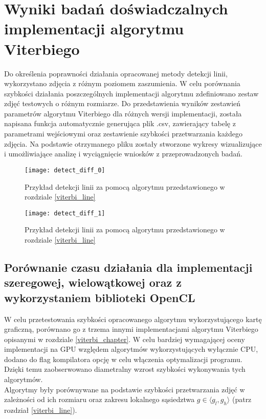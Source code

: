 \documentclass[document.tex]{subfiles}
\begin{document}
\chapter{Wyniki badań doświadczalnych \\ implementacji algorytmu Viterbiego}
\indent Do określenia poprawności działania opracowanej metody detekcji linii, 
wykorzystano zdjęcia z różnym poziomem zaszumienia. W celu porównania szybkości
działania poszczególnych implementacji algorytmu zdefiniowano zestaw zdjęć testowych
o różnym rozmiarze. Do przedstawienia wyników zestawień parametrów algorytmu Viterbiego
dla różnych wersji implementacji, została napisana funkcja automatycznie generująca plik .csv,
zawierający tabelę z parametrami wejściowymi oraz zestawienie szybkości przetwarzania każdego zdjęcia.
Na podstawie otrzymanego pliku zostały stworzone wykresy wizualizujące i umożliwiające
analizę i wyciągnięcie wniosków z przeprowadzonych badań.

\begin{figure}[h]
\texttt{[image: detect\_diff\_0]}
\caption{Przykład detekcji linii za pomocą algorytmu przedstawionego w rozdziale \ref{viterbi_line}}
\label{fig:sample_detect_0}
\end{figure}

\clearpage

\begin{figure}[h]
\texttt{[image: detect\_diff\_1]}
\caption{Przykład detekcji linii za pomocą algorytmu przedstawionego w rozdziale \ref{viterbi_line}}
\label{fig:sample_detect_1}
\end{figure}

\section{Porównanie czasu działania dla implementacji szeregowej, wielowątkowej
oraz z wykorzystaniem biblioteki OpenCL}
\indent W celu przetestowania szybkości opracowanego algorytmu wykorzystującego
kartę graficzną, porównano go z trzema innymi implementacjami algorytmu Viterbiego opisanymi
w rozdziale \ref{viterbi_chapter}.
W celu bardziej wymagającej oceny implementacji na GPU względem algorytmów wykorzystujących wyłącznie CPU, dodano
do flag kompilatora opcję  w celu włączenia optymalizacji programu.
Dzięki temu zaobserwowano diametralny wzrost szybkości wykonywania tych algorytmów.
\\
\indent Algorytmy były porównywane na podstawie szybkości przetwarzania zdjęć
w zależności od ich rozmiaru oraz zakresu lokalnego sąsiedztwa $g\in \langle g_l, g_h \rangle$
(patrz rozdział \ref{viterbi_line}).
\end{document}
